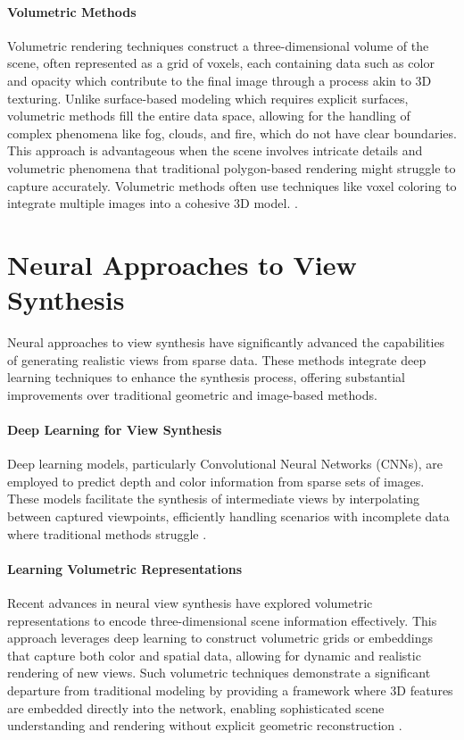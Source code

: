 \paragraph{Volumetric Methods}
Volumetric rendering techniques construct a three-dimensional volume of the scene, often represented as a grid of voxels, each containing data such as color and opacity which contribute to the final image through a process akin to 3D texturing.
Unlike surface-based modeling which requires explicit surfaces, volumetric methods fill the entire data space, allowing for the handling of complex phenomena like fog, clouds, and fire, which do not have clear boundaries.
This approach is advantageous when the scene involves intricate details and volumetric phenomena that traditional polygon-based rendering might struggle to capture accurately.
Volumetric methods often use techniques like voxel coloring to integrate multiple images into a cohesive 3D model. \cite{curless_volumetric_1996,seitz_photorealistic_1999}.

\section{Neural Approaches to View Synthesis}
Neural approaches to view synthesis have significantly advanced the capabilities of generating realistic views from sparse data.
These methods integrate deep learning techniques to enhance the synthesis process, offering substantial improvements over traditional geometric and image-based methods.

\paragraph{Deep Learning for View Synthesis}
Deep learning models, particularly Convolutional Neural Networks (CNNs), are employed to predict depth and color information from sparse sets of images.
These models facilitate the synthesis of intermediate views by interpolating between captured viewpoints, efficiently handling scenarios with incomplete data where traditional methods struggle \cite{kalantari_learning-based_2016,maxim_tatarchenko_single-view_2015,peter_hedman_deep_2019}.

\paragraph{Learning Volumetric Representations}
Recent advances in neural view synthesis have explored volumetric representations to encode three-dimensional scene information effectively.
This approach leverages deep learning to construct volumetric grids or embeddings that capture both color and spatial data, allowing for dynamic and realistic rendering of new views.
Such volumetric techniques demonstrate a significant departure from traditional modeling by providing a framework where 3D features are embedded directly into the network, enabling sophisticated scene understanding and rendering without explicit geometric reconstruction \cite{lombardi_neural_2019,sitzmann_deepvoxels_2019}.

